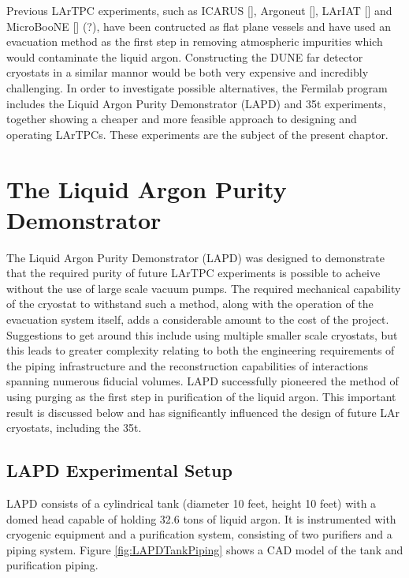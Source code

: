 Previous LArTPC experiments, such as ICARUS [], Argoneut [], LArIAT [] and MicroBooNE [] (?), have been contructed as flat plane vessels and have used an evacuation method as the first step in removing atmospheric impurities which would contaminate the liquid argon.  Constructing the DUNE far detector cryostats in a similar mannor would be both very expensive and incredibly challenging.  In order to investigate possible alternatives, the Fermilab program includes the Liquid Argon Purity Demonstrator (LAPD) and 35t experiments, together showing a cheaper and more feasible approach to designing and operating LArTPCs.  These experiments are the subject of the present chaptor.

\section{The Liquid Argon Purity Demonstrator}\label{sec:LAPD}

The Liquid Argon Purity Demonstrator (LAPD) \cite{LAPD} was designed to demonstrate that the required purity of future LArTPC experiments is possible to acheive without the use of large scale vacuum pumps.  The required mechanical capability of the cryostat to withstand such a method, along with the operation of the evacuation system itself, adds a considerable amount to the cost of the project.  Suggestions to get around this include using multiple smaller scale cryostats, but this leads to greater complexity relating to both the engineering requirements of the piping infrastructure and the reconstruction capabilities of interactions spanning numerous fiducial volumes.  LAPD successfully pioneered the method of using purging as the first step in purification of the liquid argon.  This important result is discussed below and has significantly influenced the design of future LAr cryostats, including the 35t.

\subsection{LAPD Experimental Setup}\label{sec:LAPDExperimentalSetup}

LAPD consists of a cylindrical tank (diameter 10 feet, height 10 feet) with a domed head capable of holding 32.6 tons of liquid argon.  It is instrumented with cryogenic equipment and a purification system, consisting of two purifiers and a piping system.  Figure \ref{fig:LAPDTankPiping} shows a CAD model of the tank and purification piping.

